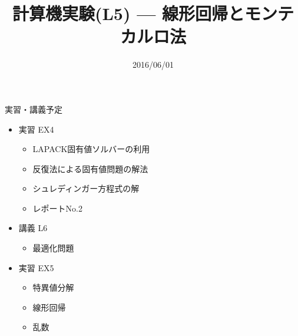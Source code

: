 \documentclass[dvipdfmx]{beamer}
\title{計算機実験(L5) --- 線形回帰とモンテカルロ法}
\date{2016/06/01}
\begin{document}
\begin{frame}
  \titlepage
  \tableofcontents
\end{frame}








\section{}
\begin{frame}[t,fragile]{実習・講義予定}
  \begin{itemize}
    \setlength{\itemsep}{1em}
  \item 実習 EX4
    \begin{itemize}
    \item LAPACK固有値ソルバーの利用
    \item 反復法による固有値問題の解法
    \item シュレディンガー方程式の解
    \item レポートNo.2
    \end{itemize}
  \item 講義 L6
    \begin{itemize}
    \item 最適化問題
    \end{itemize}
  \item 実習 EX5
    \begin{itemize}
    \item 特異値分解
    \item 線形回帰
    \item 乱数
    \end{itemize}
  \end{itemize}
\end{frame}
\end{document}
